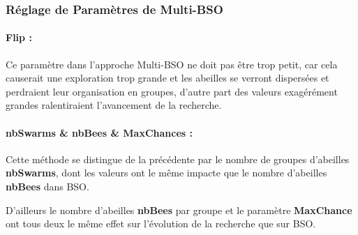 	\vspace{-0.3cm}
	\subsubsection{Réglage de Paramètres de Multi-BSO}
	\paragraph{Flip :} Ce paramètre dans l'approche Multi-BSO ne doit pas être trop petit, car cela causerait une exploration trop grande et les abeilles se verront dispersées et perdraient leur organisation en groupes, d'autre part des valeurs exagérément grandes ralentiraient l'avancement de la recherche.
	
	
	
	\paragraph{nbSwarms \& nbBees \& MaxChances :} Cette méthode se distingue de la précédente par le nombre de groupes d'abeilles \textbf{nbSwarms}, dont les valeurs ont le même impacte que le nombre d'abeilles \textbf{nbBees} dans BSO.
	
	D'ailleurs le nombre d'abeilles \textbf{nbBees} par groupe et le paramètre \textbf{MaxChance} ont tous deux le même effet sur l'évolution de la recherche que sur BSO.\\
	

